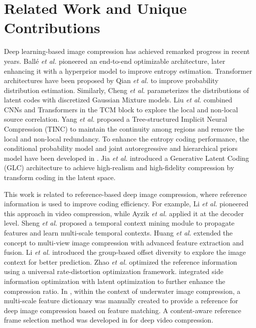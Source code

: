 \section{Related Work and Unique Contributions}
\label{sec:related_work}
Deep learning-based image compression has achieved remarked progress in recent years. Ballé \textit{et al.} \cite{balle2017end} pioneered an end-to-end optimizable architecture, later enhancing it with a hyperprior model \cite{balle2018variational} to improve entropy estimation. Transformer architectures have been proposed by Qian \textit{et al.} \cite{qian2022entroformer} to improve probability distribution estimation. Similarly, Cheng \textit{et al.} \cite{cheng2020learned} parameterizes the distributions of latent codes with discretized Gaussian Mixture models. Liu \textit{et al.} \cite{liu2023learned} combined CNNs and Transformers in the TCM block to explore the local and non-local source correlation. Yang \textit{et al.} \cite{yang2023tinc} proposed a Tree-structured Implicit Neural Compression (TINC) to maintain the continuity among regions and remove the local and non-local redundancy. To enhance the entropy coding performance, the conditional probability model and joint autoregressive and hierarchical priors model have been developed in \cite{mentzer2018conditional, minnen2018joint}. Jia \textit{et al.} \cite{jia2024generative} introduced a Generative Latent Coding (GLC) architecture to achieve high-realism and high-fidelity compression by transform coding in the latent space. 

This work is related to reference-based deep image compression, where reference information is used to improve coding efficiency. For example, Li \textit{et al.} \cite{li2021deep} pioneered this approach in video compression, while Ayzik \textit{et al.} \cite{ayzik2020deep} applied it at the decoder level. Sheng \textit{et al.} \cite{sheng2022temporal} proposed a temporal context mining module to propagate features and learn multi-scale temporal contexts. Huang \textit{\textit{et al.}} \cite{huang2023learned} extended the concept to multi-view image compression with advanced feature extraction and fusion. Li \textit{et al.} \cite{li2023neural} introduced the group-based offset diversity to explore the image context for better prediction. Zhao \textit{et al.} \cite{zhao2021universal} optimized the reference information using a universal rate-distortion optimization framework. \cite{zhao2023universal} integrated side information optimization with latent optimization to further enhance the compression ratio. In \cite{li2023rfd}, within the context of underwater image compression, a multi-scale feature dictionary was manually created to provide a reference for deep image compression based on feature matching. A content-aware reference frame selection method was developed in \cite{wu2022content} for deep video compression. 

